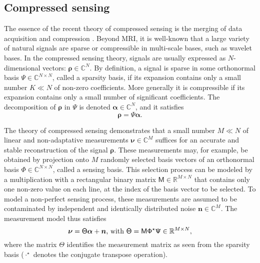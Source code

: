 \documentclass[10pt,draftcls, onecolumn]{IEEEtran}
\begin{document}
\subsection{Compressed sensing}
\label{sub:compressed sensing}

The essence of the recent theory of compressed sensing is the merging of data acquisition and compression \cite{candes06a, candes06b, candes06c, donoho06, candes07, baraniuk07a, rauhut10, donoho09}. Beyond MRI, it is well-known that a large variety of natural signals are sparse or compressible in multi-scale bases, such as wavelet bases. In the compressed sensing theory, signals are usually expressed as $N$-dimensional vectors: $\bm{\rho}\in\mathbb{C}^{N}$. By definition, a signal is sparse in some orthonormal basis $\mathsf{\Psi}\in\mathbb{C}^{N\times N}$, called a sparsity basis, if its expansion contains only a small number $K\ll N$ of non-zero coefficients. More generally it is compressible if its expansion contains only a small number of significant coefficients. The decomposition of $\bm{\rho}$ in $\mathsf{\Psi}$ is denoted $\bm{\alpha} \in \mathbb{C}^{N}$, and it satisfies
\begin{equation}
\label{cs1}
\bm{\rho} = \mathsf{\Psi}\bm{\alpha}.
\end{equation}


The theory of compressed sensing demonstrates that a small number $M\ll N$ of linear and non-adaptative measurements $\bm{\nu}\in\mathbb{C}^{M}$ suffices for an accurate and stable reconstruction of the signal $\bm{\rho}$. These measurements may, for example, be obtained by projection onto $M$ randomly selected basis vectors of an orthonormal basis $\mathsf{\Phi}\in\mathbb{C}^{N\times N}$, called a sensing basis. This selection process can be modeled by a multiplication with a rectangular binary matrix $\mathsf{M}\in\mathbb{R}^{M\times N}$ that contains only one non-zero value on each line, at the index of the basis vector to be selected. To model a non-perfect sensing process, these measurements are assumed to be contaminated by independent and identically distributed noise $\bm{n} \in \mathbb{C}^{M}$. The measurement model thus satisfies
\begin{equation}
\label{cs2}
\bm{\nu}=\mathsf{\Theta}\bm{\alpha}+\bm{n}\textnormal{, with }\mathsf{\Theta}=\mathsf{M\Phi^{\star}\Psi}\in\mathbb{R}^{M\times N},
\end{equation}
where the matrix $\mathsf{\Theta}$ identifies the measurement matrix as seen from the sparsity basis ($\cdot^\star$ denotes the conjugate transpose operation).
\end{document}
